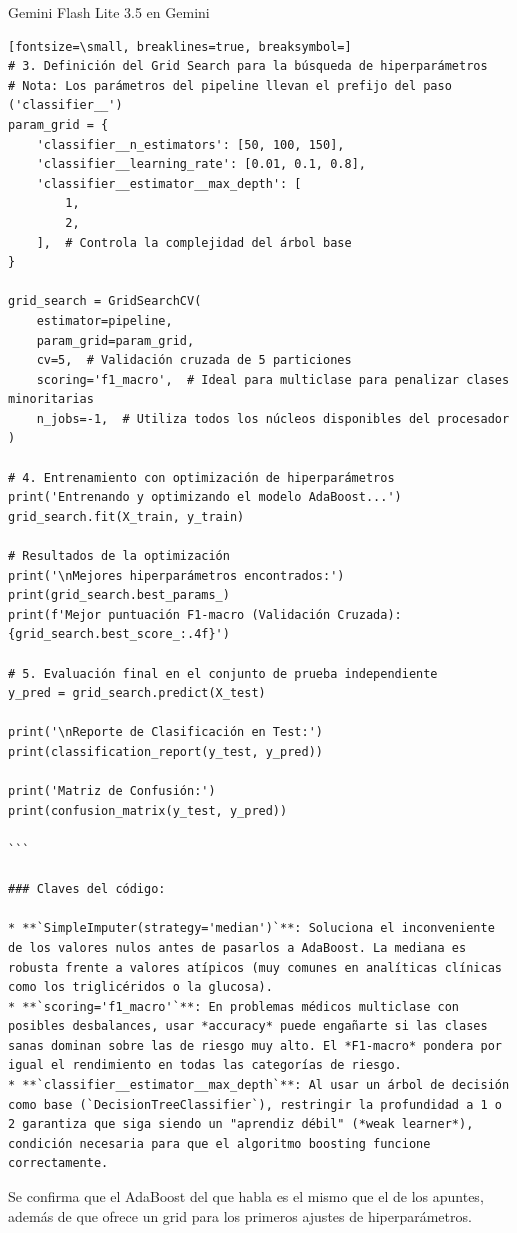 \documentclass[12pt,a4paper,oneside]{book}
\begin{document}
\begin{iaresp}{Gemini Flash Lite 3.5 en Gemini}
\begin{Verbatim}[fontsize=\small, breaklines=true, breaksymbol=]
# 3. Definición del Grid Search para la búsqueda de hiperparámetros
# Nota: Los parámetros del pipeline llevan el prefijo del paso ('classifier__')
param_grid = {
    'classifier__n_estimators': [50, 100, 150],
    'classifier__learning_rate': [0.01, 0.1, 0.8],
    'classifier__estimator__max_depth': [
        1,
        2,
    ],  # Controla la complejidad del árbol base
}

grid_search = GridSearchCV(
    estimator=pipeline,
    param_grid=param_grid,
    cv=5,  # Validación cruzada de 5 particiones
    scoring='f1_macro',  # Ideal para multiclase para penalizar clases minoritarias
    n_jobs=-1,  # Utiliza todos los núcleos disponibles del procesador
)

# 4. Entrenamiento con optimización de hiperparámetros
print('Entrenando y optimizando el modelo AdaBoost...')
grid_search.fit(X_train, y_train)

# Resultados de la optimización
print('\nMejores hiperparámetros encontrados:')
print(grid_search.best_params_)
print(f'Mejor puntuación F1-macro (Validación Cruzada): {grid_search.best_score_:.4f}')

# 5. Evaluación final en el conjunto de prueba independiente
y_pred = grid_search.predict(X_test)

print('\nReporte de Clasificación en Test:')
print(classification_report(y_test, y_pred))

print('Matriz de Confusión:')
print(confusion_matrix(y_test, y_pred))

```

### Claves del código:

* **`SimpleImputer(strategy='median')`**: Soluciona el inconveniente de los valores nulos antes de pasarlos a AdaBoost. La mediana es robusta frente a valores atípicos (muy comunes en analíticas clínicas como los triglicéridos o la glucosa).
* **`scoring='f1_macro'`**: En problemas médicos multiclase con posibles desbalances, usar *accuracy* puede engañarte si las clases sanas dominan sobre las de riesgo muy alto. El *F1-macro* pondera por igual el rendimiento en todas las categorías de riesgo.
* **`classifier__estimator__max_depth`**: Al usar un árbol de decisión como base (`DecisionTreeClassifier`), restringir la profundidad a 1 o 2 garantiza que siga siendo un "aprendiz débil" (*weak learner*), condición necesaria para que el algoritmo boosting funcione correctamente.
\end{Verbatim}
\end{iaresp}
\begin{iaanalisis}
Se confirma que el AdaBoost del que habla es el mismo que el de los apuntes, además de que ofrece un grid para los primeros ajustes de hiperparámetros.
\end{iaanalisis}
\end{document}
